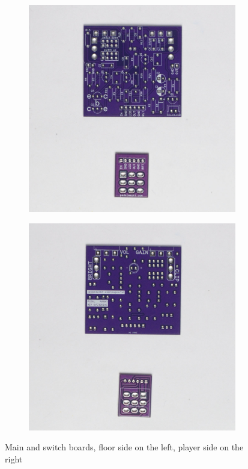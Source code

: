 \documentclass[a4paper,12pt]{article}
\begin{document}
\begin{figure}[h!]
  \centering
  \begin{subfigure}[b]{0.49\textwidth}
    \centering
    \includegraphics[width=\textwidth]{build/01-board-floor-1000px.jpg}
  \end{subfigure}
  \begin{subfigure}[b]{0.49\textwidth}
    \centering
    \includegraphics[width=\textwidth]{build/02-board-player-1000px.jpg}
  \end{subfigure}
  \caption{Main and switch boards, floor side on the left,
  player side on the right}
\end{figure}
\end{document}
